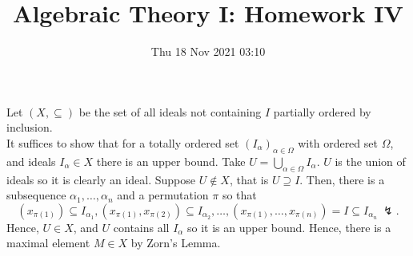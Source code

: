 \documentclass[a4paper]{article}
\title{Algebraic Theory I: Homework IV}
\date{Thu 18 Nov 2021 03:10}
\begin{document}
\maketitle
\begin{problem}[1]
	Let \(\left( X, \subseteq \right) \) be the set of all ideals not containing \(I\) partially ordered by inclusion.\\
	It suffices to show that for a totally ordered set \(\left( I_{\alpha} \right)_{\alpha \in \Omega} \) with ordered set \(\Omega\), and ideals \(I_{\alpha} \in X\) there is an upper bound. Take \(U = \bigcup_{\alpha \in \Omega} I_{\alpha}  \). \(U\) is the union of ideals so it is clearly an ideal. Suppose \(U \not\in X\), that is \(U \supseteq I\). Then, there is a subsequence \(\alpha_1, \ldots, \alpha_{n}\) and a permutation \(\pi\)  so that \[\left( x_{\pi\left( 1 \right) } \right) \subseteq I_{\alpha_1}, \left( x_{\pi\left( 1 \right) }, x_{\pi\left( 2 \right) } \right) \subseteq I_{\alpha_2},  \ldots, \left( x_{\pi \left( 1 \right) }, \ldots, x_{\pi(n)} \right) = I \subseteq I_{\alpha_{n}} \ \lightning .\] Hence, \(U \in X\), and \(U\) contains all \(I_{\alpha}\) so it is an upper bound. Hence, there is a maximal element \(M \in X\) by Zorn's Lemma.
\end{problem}
\newpage
\end{document}
